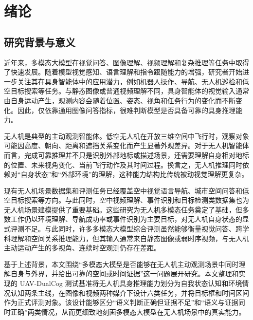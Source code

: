 
\chapter{绪论}

\section{研究背景与意义}

近年来，多模态大模型在视觉问答、图像理解、视频理解和复杂推理等任务中取得了快速发展。随着模型视觉感知、语言理解和指令跟随能力的增强，研究者开始进一步关注其在具身智能体中的应用潜力，例如机器人操作、导航、无人机巡检和低空目标搜索等任务\cite{zeng2023robotics,li2025perception,han2025survey,lin2024embodied}。与静态图像或普通视频理解不同，具身智能体的视觉输入通常由自身运动产生，观测内容会随着位置、姿态、视角和任务行为的变化而不断变化。因此，仅依靠通用图像问答指标，很难判断模型是否具备可靠的具身推理能力。

无人机是典型的主动观测智能体。低空无人机在开放三维空间中飞行时，观察对象可能因高度、朝向、距离和遮挡关系变化而产生显著外观差异。对于无人机智能体而言，完成可靠推理并不只是识别外部地标或描述场景，还需要理解自身相对地标的位置、未来视角变化、当前飞行动作及其时间过程。换言之，无人机推理同时依赖对“自身状态”和“外部环境”的理解，这种能力结构比传统被动视觉理解更复杂。

现有无人机场景数据集和评测任务已经覆盖空中视觉语言导航、城市空间问答和低空目标搜索等方向\cite{liu2023aerialvln,lee2025citynav,zhao2025cityeqa,ji2026towards}。与此同时，空中视频理解、事件识别和目标检测类数据集也为无人机场景建模提供了重要基础\cite{li2021uavhuman,zhao2025urbanvideobench,barekatain2017okutama,du2018unmanned}。这些研究为无人机多模态任务奠定了基础，但多数工作仍以环境理解、导航成功率或事件识别为主要目标，对无人机自身状态的显式评测不足。与此同时，许多多模态大模型综合评测虽然能够衡量视觉问答、跨学科理解和空间关系推理能力\cite{fu2023mme,liu2024mmbench,yu2023mmvet,yue2024mmmu,ge2025mllm}，但其输入通常来自静态图像或弱时序视频，与无人机主动运动产生的多视角、连续时空观测仍存在差距。

基于上述背景，本文围绕“多模态大模型是否能够在无人机主动观测场景中同时理解自身与外界，并给出可靠的空间或时间证据”这一问题展开研究。本文整理和实现的 UAV-DualCog 测试基准将无人机具身推理能力划分为自我状态认知和环境情况认知两条主线，在图像和视频两种媒介下设计六类任务，并将目标框和时间区间作为正式评测对象。该设计能够区分“语义判断正确但证据不足”和“语义与证据同时正确”两类情况，从而更细致地刻画多模态大模型在无人机场景中的真实能力。

